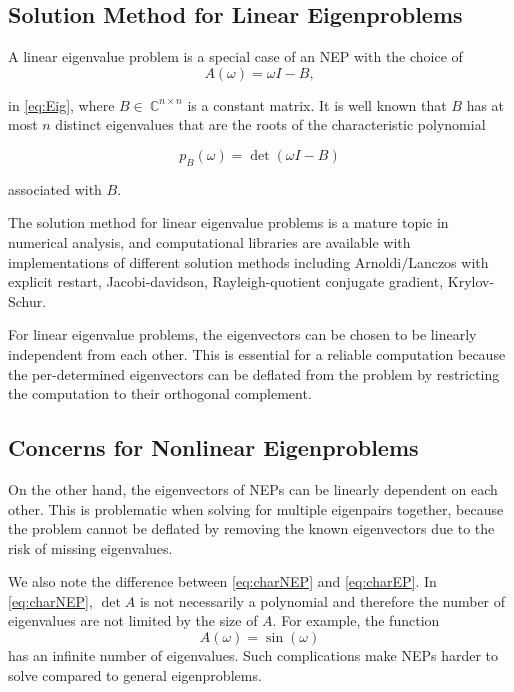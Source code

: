 \documentclass[final,leqno,onefignum,onetabnum]{siamltex1213}
\begin{document}
\subsection{Solution Method for Linear Eigenproblems }
\pagebreak
A linear eigenvalue problem is a special case of an NEP with the choice of 
\begin{equation} 
\label{eq:LEP}
A(\omega )= \omega I - B,
\end{equation}

in \ref{eq:Eig}, where $B \in\ \mathbb{C}^{n \times n}$ is a constant matrix. It is well known that $B$ has at most $n$ distinct eigenvalues that are the roots of the characteristic polynomial

\begin{equation}
	\label{eq:charEP}
	p_{B}(\omega)=\det(\omega I -B)
\end{equation}  

associated with $B$. 

The solution method for linear eigenvalue problems is a mature topic in numerical analysis, and computational libraries are available with implementations of different solution methods including Arnoldi$/$Lanczos with explicit restart, Jacobi-davidson, Rayleigh-quotient conjugate gradient, Krylov-Schur.  \citep{hernandez2005slepc} 

For linear eigenvalue problems, the eigenvectors can be chosen to be linearly independent from each other. This is essential for a reliable computation because the per-determined eigenvectors can be deflated from the problem by restricting the computation to their orthogonal complement. 

\subsection{Concerns for Nonlinear Eigenproblems}

On the other hand, the eigenvectors of NEPs can be linearly dependent on each other. This is problematic when solving for multiple eigenpairs together, because the problem cannot be deflated by removing the known eigenvectors due to the risk of missing eigenvalues.

We also note the difference between \ref{eq:charNEP} and \ref{eq:charEP}. In \ref{eq:charNEP}, $\det A$ is not necessarily a polynomial and therefore the number of eigenvalues are not limited by the size of $A$. For example, the function
\begin{equation*}
A(\omega) = \sin(\omega)
\end{equation*} 
has an infinite number of eigenvalues. Such complications make NEPs harder to solve compared to general eigenproblems. 
\end{document}
